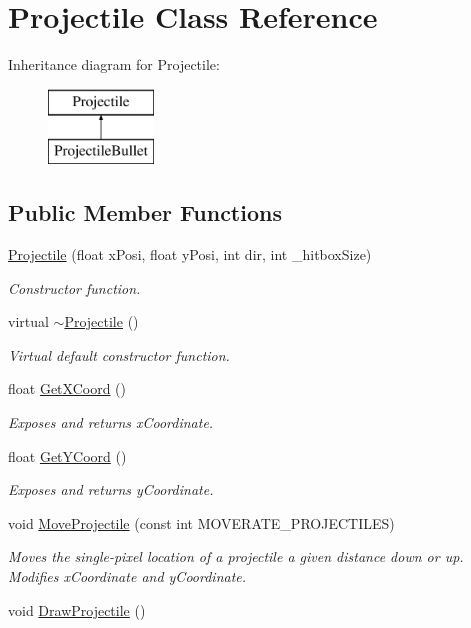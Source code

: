 \hypertarget{class_projectile}{}\section{Projectile Class Reference}
\label{class_projectile}
Inheritance diagram for Projectile\+:\begin{figure}[H]
\begin{center}
\leavevmode
\includegraphics[height=2.000000cm]{class_projectile}
\end{center}
\end{figure}
\subsection*{Public Member Functions}
\begin{DoxyCompactItemize}
\item 
\hyperlink{class_projectile_a9f5c35e63c72e01ecc6a2b9d0b250aff}{Projectile} (float x\+Posi, float y\+Posi, int dir, int \+\_\+hitbox\+Size)
\begin{DoxyCompactList}\small\item\em Constructor function. \end{DoxyCompactList}\item 
virtual \hyperlink{class_projectile_a94903e021fa2edab60ba3836ca0b937d}{$\sim$\+Projectile} ()
\begin{DoxyCompactList}\small\item\em Virtual default constructor function. \end{DoxyCompactList}\item 
float \hyperlink{class_projectile_aefcef09fde3c66ddbbcc58f599bd7965}{Get\+X\+Coord} ()
\begin{DoxyCompactList}\small\item\em Exposes and returns x\+Coordinate. \end{DoxyCompactList}\item 
float \hyperlink{class_projectile_a2c5fabef6aa3fc8831717a2b1751adcd}{Get\+Y\+Coord} ()
\begin{DoxyCompactList}\small\item\em Exposes and returns y\+Coordinate. \end{DoxyCompactList}\item 
void \hyperlink{class_projectile_a9eff3315fef4f92927d52dd9372a3f35}{Move\+Projectile} (const int M\+O\+V\+E\+R\+A\+T\+E\+\_\+\+P\+R\+O\+J\+E\+C\+T\+I\+L\+ES)
\begin{DoxyCompactList}\small\item\em Moves the single-\/pixel location of a projectile a given distance down or up. Modifies x\+Coordinate and y\+Coordinate. \end{DoxyCompactList}\item 
void \hyperlink{class_projectile_a47422fcf423ec9068329fe899a571e62}{Draw\+Projectile} ()
\end{DoxyCompactItemize}
